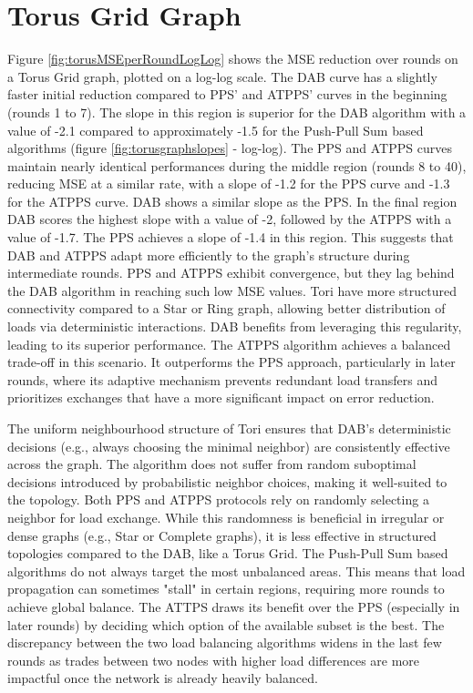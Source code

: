 \section{Torus Grid Graph}\label{sec:torusgridGraph}
Figure \ref{fig:torusMSEperRoundLogLog} shows the MSE reduction over rounds on a Torus Grid graph, plotted on a log-log scale. The DAB curve has a slightly faster initial reduction compared to PPS' and ATPPS' curves in the beginning (rounds 1 to 7). The slope in this region is superior for the DAB algorithm with a value of -2.1 compared to approximately -1.5 for the Push-Pull Sum based algorithms (figure \ref{fig:torusgraphslopes} - log-log). The PPS and ATPPS curves maintain nearly identical performances during the middle region (rounds 8 to 40), reducing MSE at a similar rate, with a slope of -1.2 for the PPS curve and -1.3 for the ATPPS curve. DAB shows a similar slope as the PPS. In the final region DAB scores the highest slope with a value of -2, followed by the ATPPS with a value of -1.7. The PPS achieves a slope of -1.4 in this region. This suggests that DAB and ATPPS adapt more efficiently to the graph's structure during intermediate rounds. PPS and ATPPS exhibit convergence, but they lag behind the DAB algorithm in reaching such low MSE values. Tori have more structured connectivity compared to a Star or Ring graph, allowing better distribution of loads via deterministic interactions. DAB benefits from leveraging this regularity, leading to its superior performance. The ATPPS algorithm achieves a balanced trade-off in this scenario. It outperforms the PPS approach, particularly in later rounds, where its adaptive mechanism prevents redundant load transfers and prioritizes exchanges that have a more significant impact on error reduction.

The uniform neighbourhood structure of Tori ensures that DAB's deterministic decisions (e.g., always choosing the minimal neighbor) are consistently effective across the graph. The algorithm does not suffer from random suboptimal decisions introduced by probabilistic neighbor choices, making it well-suited to the topology. Both PPS and ATPPS protocols rely on randomly selecting a neighbor for load exchange. While this randomness is beneficial in irregular or dense graphs (e.g., Star or Complete graphs), it is less effective in structured topologies compared to the DAB, like a Torus Grid. The Push-Pull Sum based algorithms do not always target the most unbalanced areas. This means that load propagation can sometimes "stall" in certain regions, requiring more rounds to achieve global balance. The ATTPS draws its benefit over the PPS (especially in later rounds) by deciding which option of the available subset is the best. The discrepancy between the two load balancing algorithms widens in the last few rounds as trades between two nodes with higher load differences are more impactful once the network is already heavily balanced.

